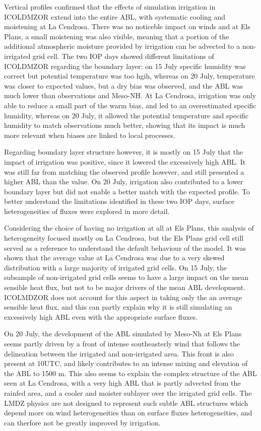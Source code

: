 Vertical profiles confirmed that the effects of simulation irrigation in ICOLDMZOR extend into the entire ABL, with systematic cooling and moistening at La Cendrosa. There was no noticeble impact on winds and at Els Plans, a small moistening was also visible, meaning that a portion of the additional atmospheric moisture provided by irrigation can be advected to a non-irrigated grid cell.
The two IOP days showed different limitations of ICOLDMZOR regarding the boundary layer: on 15 July specific humidity was correct but potential temperature was too hgih, whereas on 20 July, temperature was closer to expected values, but a dry bias was observed, and the ABL was much lower than observations and Meso-NH.
At La Cendrosa, \irrboost irrigation was only able to reduce a small part of the warm bias, and led to an overestimated specific humidity, whereas on 20 July, it allowed the potential temperature and specific humidity to match observations much better, showing that its impact is much more relevant when biases are linked to local processes.

Regarding boundary layer structure however, it is mostly on 15 July that the impact of irrigation was positive, since it lowered the excessively high ABL. It was still far from matching the observed profile however, and still presented a higher ABL than the \mesomean value. 
On 20 July, irrigation also contributed to a lower boundary layer but did not enable a better match with the expected profile. 
To better understand the limitations identified in these two IOP days, surface heterogeneities of fluxes were explored in more detail.

\hfill

Considering the choice of having no irrigation at all at Els Plans, this analysis of heterogeneity focused mostly on La Cendrosa, but the Els Plans grid cell still served as a reference to understand the default behaviour of the model.
It was shown that the \mesomean average value at La Cendrosa was due to a very skewed distribution with a large majority of irrigated grid cells. 
On 15 July, the subsample of non-irrigated grid cells seems to have a large impact on the mean sensible heat flux, but not to be major drivers of the mean ABL development. ICOLMDZOR does not account for this aspect in taking only the an average sensible heat flux, and this can partly explain why it is still simulating an excessively high ABL even with the appropriate surface fluxes.

On 20 July, the development of the ABL simulated by Meso-Nh at Els Plans seems partly driven by a front of intense southeasterly wind that follows the delineation between the irrigated and non-irrigated area. This front is also present at 10UTC, and likely contributes to an intense mixing and elevation of the ABL to 1500 m. This also seems to explain the complex structure of the ABL seen at La Cendrosa, with a very high ABL that is partly advected from the rainfed area, and a cooler and moister sublayer over the irrigated grid cells. 
The LMDZ physics are not designed to represent such subtle ABL structures which depend more on wind heterogeneities than on surface fluxes heterogeneities, and can therfore not be greatly improved by irrigation.

